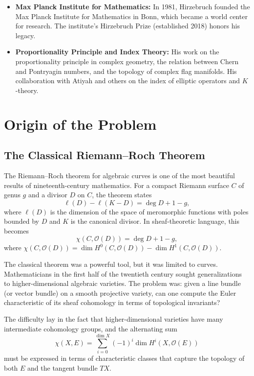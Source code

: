 \begin{itemize}
    \item \textbf{Max Planck Institute for Mathematics:}
    In 1981, Hirzebruch founded the Max Planck Institute for
    Mathematics in Bonn, which became a world center for research. The
    institute's Hirzebruch Prize (established 2018) honors his legacy.

    \item \textbf{Proportionality Principle and Index Theory:}
    His work on the proportionality principle in complex geometry, the
    relation between Chern and Pontryagin numbers, and the topology of
    complex flag manifolds. His collaboration with Atiyah and others
    on the index of elliptic operators and \(K\)-theory.
\end{itemize}

\section{Origin of the Problem}

\subsection{The Classical Riemann--Roch Theorem}

The Riemann--Roch theorem for algebraic curves is one of the most
beautiful results of nineteenth-century mathematics. For a compact
Riemann surface \(C\) of genus \(g\) and a divisor \(D\) on \(C\), the
theorem states
\[
\ell(D) - \ell(K - D) = \deg D + 1 - g,
\]
where \(\ell(D)\) is the dimension of the space of meromorphic functions
with poles bounded by \(D\) and \(K\) is the canonical divisor. In
sheaf-theoretic language, this becomes
\[
\chi(C, \mathcal{O}(D)) = \deg D + 1 - g,
\]
where
\(\chi(C, \mathcal{O}(D)) = \dim H^0(C, \mathcal{O}(D)) -
\dim H^1(C, \mathcal{O}(D))\).

The classical theorem was a powerful tool, but it was limited to curves.
Mathematicians in the first half of the twentieth century sought
generalizations to higher-dimensional algebraic varieties. The problem
was: given a line bundle (or vector bundle) on a smooth projective
variety, can one compute the Euler characteristic of its sheaf
cohomology in terms of topological invariants?

The difficulty lay in the fact that higher-dimensional varieties have
many intermediate cohomology groups, and the alternating sum
\[
\chi(X, E) = \sum_{i=0}^{\dim X} (-1)^i \dim H^i(X, \mathcal{O}(E))
\]
must be expressed in terms of characteristic classes that capture the
topology of both \(E\) and the tangent bundle \(TX\).

